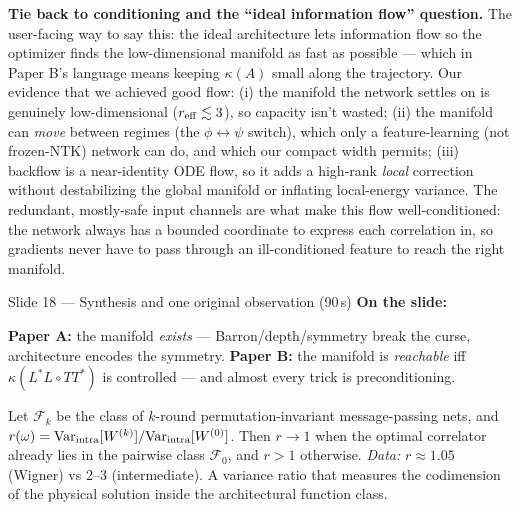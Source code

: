 \documentclass[11pt]{article}
\begin{document}
\begin{depth}
\textbf{Tie back to conditioning and the ``ideal information flow'' question.} The user-facing way to
say this: the ideal architecture lets information flow so the optimizer finds the low-dimensional
manifold as fast as possible --- which in Paper B's language means keeping $\kappa(A)$ small along the
trajectory. Our evidence that we achieved good flow: (i) the manifold the network settles on is
genuinely low-dimensional ($r_{\rm eff}\lesssim3$), so capacity isn't wasted; (ii) the manifold can
\emph{move} between regimes (the $\phi\leftrightarrow\psi$ switch), which only a feature-learning (not
frozen-NTK) network can do, and which our compact width permits; (iii) backflow is a near-identity
ODE flow, so it adds a high-rank \emph{local} correction without destabilizing the global manifold or
inflating local-energy variance. The redundant, mostly-safe input channels are what make this flow
well-conditioned: the network always has a bounded coordinate to express each correlation in, so
gradients never have to pass through an ill-conditioned feature to reach the right manifold.
\end{depth}

\begin{slide}{Slide 18 --- Synthesis and one original observation (90\,s)}
\textbf{On the slide:}

\begin{tcolorbox}[colback=yellow!10,colframe=yellow!50!black,
title=\textbf{The two papers, unified by our example},fonttitle=\bfseries]
\textbf{Paper A:} the manifold \emph{exists} --- Barron/depth/symmetry break the curse, architecture
encodes the symmetry. \quad\textbf{Paper B:} the manifold is \emph{reachable} iff $\kappa(L^\ast L\circ
TT^\ast)$ is controlled --- and almost every trick is preconditioning.
\end{tcolorbox}

\begin{tcolorbox}[colback=green!7,colframe=green!50!black,
title=\textbf{Original observation: codimension-in-pairwise},fonttitle=\bfseries]
Let $\mathcal F_k$ be the class of $k$-round permutation-invariant message-passing nets, and
$r(\omega)=\mathrm{Var}_{\rm intra}[W^{(k)}]/\mathrm{Var}_{\rm intra}[W^{(0)}]$. Then $r\to1$ when the
optimal correlator already lies in the pairwise class $\mathcal F_0$, and $r>1$ otherwise. \emph{Data:}
$r\approx1.05$ (Wigner) vs $2$--$3$ (intermediate). A variance ratio that measures the codimension of
the physical solution inside the architectural function class.
\end{tcolorbox}
\end{slide}
\end{document}
